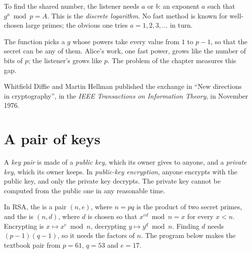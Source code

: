 To find the shared number, the listener needs $a$ or $b$: an exponent $a$ such that $g^a \bmod p = A$. This is the
\emph{discrete logarithm}. No fast method is known for well-chosen large primes; the obvious one tries
$a = 1, 2, 3, \dots$ in turn.

\label{lst:g12:secure-communication:brute}

\label{lst:g12:secure-communication:brute-run}

\label{out:g12:secure-communication:brute}

The function  picks a $g$ whose powers take every value from $1$ to $p - 1$, so that the secret can
be any of them. Alice's work, one fast power, grows like the number of bits of $p$; the listener's grows like $p$. The
problem of the chapter measures this gap.

\begin{history}
Whitfield Diffie and Martin Hellman published the exchange in ``New directions in cryptography'', in the
\emph{IEEE Transactions on Information Theory}, in November 1976.
\end{history}

\section{A pair of keys}\label{sec:g12:secure-communication:rsa}

\begin{definition}\label{def:g12:secure-communication:key-pair}
A \emph{key pair} is made of a \emph{public key}, which its owner gives to anyone, and a
\emph{private key}, which its owner keeps. In \emph{public-key encryption}, anyone encrypts with the public key, and only the private key decrypts. The private key cannot be
computed from the public one in any reasonable time.
\end{definition}

In RSA, the  is a pair $(n, e)$, where $n = pq$ is the product of two secret primes, and the  is
$(n, d)$, where $d$ is chosen so that $x^{ed} \bmod n = x$ for every $x < n$. Encrypting is $x \mapsto x^e \bmod n$,
decrypting $y \mapsto y^d \bmod n$. Finding $d$ needs $(p - 1)(q - 1)$, so it needs the factors of $n$. The program
below makes the textbook pair from $p = 61$, $q = 53$ and $e = 17$.

